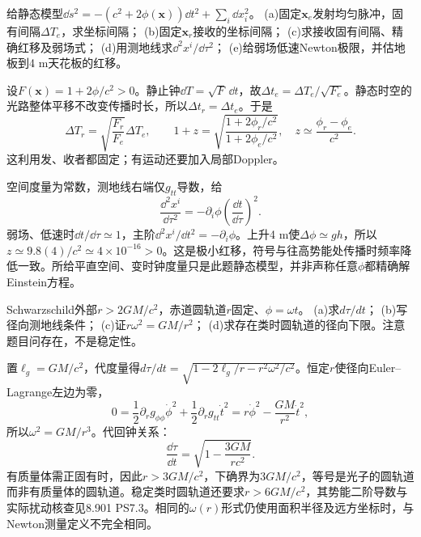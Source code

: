 \begin{exercise}
给静态模型$\dd s^2=-(c^2+2\phi(\boldsymbol x))\dd t^2+\sum_i\dd x_i^2$。
(a)固定$\boldsymbol x_e$发射均匀脉冲，固有间隔$\Delta T_e$，求坐标间隔；
(b)固定$\boldsymbol x_r$接收的坐标间隔；
(c)求接收固有间隔、精确红移及弱场式；
(d)用测地线求$\dd^2x^i/\dd\tau^2$；
(e)给弱场低速Newton极限，并估地板到4 m天花板的红移。
\end{exercise}
\begin{solution}
设$F(\boldsymbol x)=1+2\phi/c^2>0$。静止钟$\dd T=\sqrt F\,\dd t$，故$\Delta t_e=\Delta T_e/\sqrt{F_e}$。静态时空的光路整体平移不改变传播时长，所以$\Delta t_r=\Delta t_e$。于是
\[
 \Delta T_r=\sqrt{\frac{F_r}{F_e}}\Delta T_e,\qquad
 1+z=\sqrt{\frac{1+2\phi_r/c^2}{1+2\phi_e/c^2}},
 \quad z\simeq\frac{\phi_r-\phi_e}{c^2}.
\]
这利用发、收者都固定；有运动还要加入局部Doppler。

空间度量为常数，测地线右端仅$g_{tt}$导数，给
\[
 \frac{\dd^2x^i}{\dd\tau^2}
 =-\partial_i\phi\left(\frac{\dd t}{\dd\tau}\right)^2.
\]
弱场、低速时$\dd t/\dd\tau\simeq1$，主阶$\dd^2x^i/\dd t^2=-\partial_i\phi$。上升4 m使$\Delta\phi\simeq gh$，所以$z\simeq9.8(4)/c^2\simeq4\times10^{-16}>0$。这是极小红移，符号与往高势能处传播时频率降低一致。所给平直空间、变时钟度量只是此题静态模型，并非声称任意$\phi$都精确解Einstein方程。
\end{solution}

\begin{exercise}
Schwarzschild外部$r>2GM/c^2$，赤道圆轨道$r$固定、$\phi=\omega t$。
(a)求$d\tau/dt$；
(b)写径向测地线条件；
(c)证$r\omega^2=GM/r^2$；
(d)求存在类时圆轨道的径向下限。注意题目问存在，不是稳定性。
\end{exercise}
\begin{solution}
置$\ell_g=GM/c^2$，代度量得$d\tau/dt=\sqrt{1-2\ell_g/r-r^2\omega^2/c^2}$。恒定$r$使径向Euler--Lagrange左边为零，
\[
 0=\frac12\partial_rg_{\phi\phi}\dot\phi^2
 +\frac12\partial_rg_{tt}\dot t^2
 =r\dot\phi^2-\frac{GM}{r^2}\dot t^2,
\]
所以$\omega^2=GM/r^3$。代回钟关系：
\[
 \frac{\dd\tau}{\dd t}=\sqrt{1-\frac{3GM}{rc^2}}.
\]
有质量体需正固有时，因此$r>3GM/c^2$，下确界为$3GM/c^2$，等号是光子的圆轨道而非有质量体的圆轨道。稳定类时圆轨道还要求$r>6GM/c^2$，其势能二阶导数与实际扰动核查见8.901 PS7.3。相同的$\omega(r)$形式仍使用面积半径及远方坐标时，与Newton测量定义不完全相同。
\end{solution}

